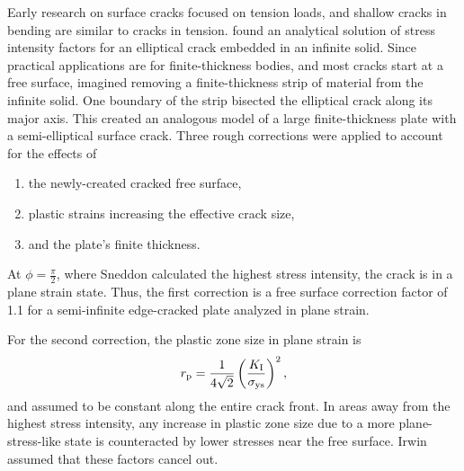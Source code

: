Early research on surface cracks focused on tension loads, and shallow cracks in bending are similar to cracks in tension. \citet{greensneddon1950} found an analytical solution of stress intensity factors for an elliptical crack embedded in an infinite solid.
Since practical applications are for finite-thickness bodies, and most cracks start at a free surface, \citet{irwin1962} imagined removing a finite-thickness strip of material from the infinite solid.
One boundary of the strip bisected the elliptical crack along its major axis.
This created an analogous model of a large finite-thickness plate with a semi-elliptical surface crack.
Three rough corrections were applied to account for the effects of
\begin{enumerate}
\item the newly-created cracked free surface,
\item plastic strains increasing the effective crack size,
\item and the plate's finite thickness.
\end{enumerate}
At \(\phi= \frac{\pi}{2}\), where Sneddon calculated the highest stress intensity, the crack is in a plane strain state.
Thus, the first correction is a free surface correction factor of 1.1 for a semi-infinite edge-cracked plate analyzed in plane strain.

For the second correction, the plastic zone size in plane strain is
\[r_{\textnormal{p}} = \frac{1}{4\sqrt{2}} \left(\frac{K_\textnormal{I}}{\sigma_{\textnormal{ys}}}\right)^2, \]
and assumed to be constant along the entire crack front.
In areas away from the highest stress intensity, any increase in plastic zone size due to a more plane-stress-like state is counteracted by lower stresses near the free surface.
Irwin assumed that these factors cancel out.

